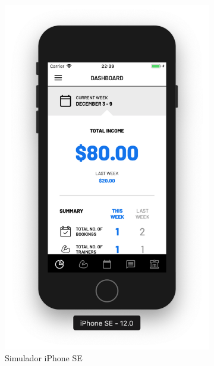 \begin{figure}[H]
	\centering
    \begin{subfigure}[b]{0.3\textwidth}
        \includegraphics[width=\textwidth]{pfc/figuras/se.png}
        \caption{Simulador iPhone SE}
        \label{fig:se}
    \end{subfigure}
    ~
	\begin{subfigure}[b]{0.3\textwidth}

\end{subfigure}
\end{figure}
